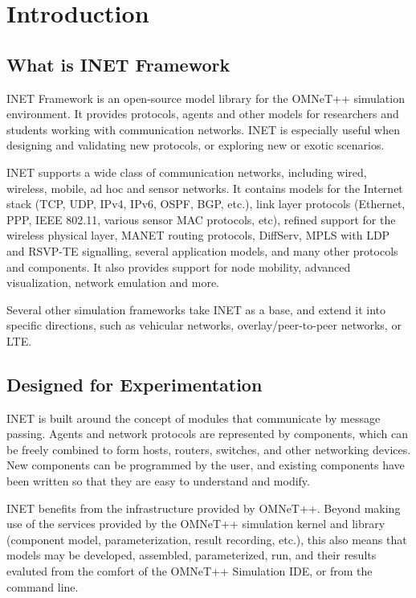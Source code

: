 \chapter{Introduction}
\label{cha:introduction}


\section{What is INET Framework}

INET Framework is an open-source model library for the OMNeT++ simulation
environment. It provides protocols, agents and other models for researchers 
and students working with communication networks. INET is especially useful 
when designing and validating new protocols, or exploring new or exotic scenarios.

INET supports a wide class of communication networks, including wired, 
wireless, mobile, ad hoc and sensor networks.  It contains models for 
the Internet stack (TCP, UDP, IPv4, IPv6, OSPF, BGP, etc.), link layer protocols 
(Ethernet, PPP, IEEE 802.11, various sensor MAC protocols, etc), 
refined support for the wireless physical layer, MANET routing protocols, 
DiffServ, MPLS with LDP and RSVP-TE signalling, several application models,
and many other protocols and components. It also provides support for 
node mobility, advanced visualization, network emulation and more. 

Several other simulation frameworks take INET as a base, and extend it 
into specific directions, such as vehicular networks, overlay/peer-to-peer 
networks, or LTE.

\section{Designed for Experimentation}

INET is built around the concept of modules that communicate by message passing.
Agents and network protocols are represented by components, which can be freely
combined to form hosts, routers, switches, and other networking devices. 
New components can be programmed by the user, and existing components have 
been written so that they are easy to understand and modify.

INET benefits from the infrastructure provided by OMNeT++. Beyond making 
use of the services provided by the OMNeT++ simulation kernel and library
(component model, parameterization, result recording, etc.), this also means
that models may be developed, assembled, parameterized, run, and their 
results evaluted from the comfort of the OMNeT++ Simulation IDE, or 
from the command line.

